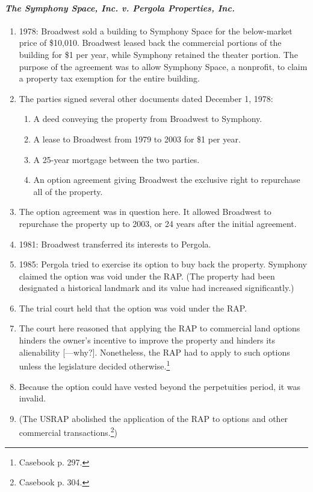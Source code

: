 \paragraph{\emph{The Symphony Space, Inc. v. Pergola Properties, Inc.}}

\begin{enumerate}
    \item 1978: Broadwest sold a building to Symphony Space for the 
    below-market price of \$10,010. Broadwest leased back the commercial 
    portions of the building for \$1 per year, while Symphony retained the 
    theater portion. The purpose of the agreement was to allow Symphony 
    Space, a nonprofit, to claim a property tax exemption for the entire 
    building.
    \item The parties signed several other documents dated December 1, 1978:
    \begin{enumerate}
        \item A deed conveying the property from Broadwest to Symphony.
        \item A lease to Broadwest from 1979 to 2003 for \$1 per year.
        \item A 25-year mortgage between the two parties.
        \item An option agreement giving Broadwest the exclusive right to 
        repurchase all of the property.
    \end{enumerate}
    \item The option agreement was in question here. It allowed Broadwest to 
    repurchase the property up to 2003, or 24 years after the initial 
    agreement.
    \item 1981: Broadwest transferred its interests to Pergola.
    \item 1985: Pergola tried to exercise its option to buy back the property. 
    Symphony claimed the option was void under the RAP. (The property had been 
    designated a historical landmark and its value had increased 
    significantly.)
    \item The trial court held that the option was void under the RAP.
    \item The court here reasoned that applying the RAP to commercial land 
    options hinders the owner's incentive to improve the property and hinders 
    its alienability [---why?]. Nonetheless, the RAP had to apply to such 
    options unless the legislature decided otherwise.\footnote{Casebook p. 
    297.}
    \item Because the option could have vested beyond the perpetuities period, 
    it was invalid.
    \item (The USRAP abolished the application of the RAP to options and other 
    commercial transactions.\footnote{Casebook p. 304.})
\end{enumerate}

